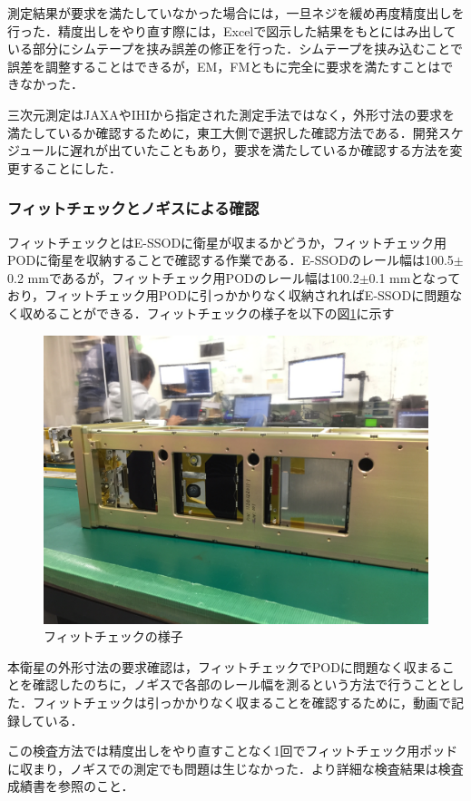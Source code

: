 測定結果が要求を満たしていなかった場合には，一旦ネジを緩め再度精度出しを行った．精度出しをやり直す際には，Excelで図示した結果をもとにはみ出している部分にシムテープを挟み誤差の修正を行った．シムテープを挟み込むことで誤差を調整することはできるが，EM，FMともに完全に要求を満たすことはできなかった．

三次元測定はJAXAやIHIから指定された測定手法ではなく，外形寸法の要求を満たしているか確認するために，東工大側で選択した確認方法である．開発スケジュールに遅れが出ていたこともあり，要求を満たしているか確認する方法を変更することにした．

\subsubsection{フィットチェックとノギスによる確認}

フィットチェックとはE-SSODに衛星が収まるかどうか，フィットチェック用PODに衛星を収納することで確認する作業である．E-SSODのレール幅は100.5$\pm$0.2 mmであるが，フィットチェック用PODのレール幅は100.2$\pm$0.1 mmとなっており，フィットチェック用PODに引っかかりなく収納されればE-SSODに問題なく収めることができる．フィットチェックの様子を以下の図\ref{fig:fitcheck}に示す

\begin{figure}[h]
	\begin{center}
		
		\includegraphics[width=0.6\linewidth]{04/fig/fitcheck.JPG}
		\caption{フィットチェックの様子}
		\label{fig:fitcheck}
		
	\end{center}
\end{figure}

本衛星の外形寸法の要求確認は，フィットチェックでPODに問題なく収まることを確認したのちに，ノギスで各部のレール幅を測るという方法で行うこととした．フィットチェックは引っかかりなく収まることを確認するために，動画で記録している．

この検査方法では精度出しをやり直すことなく1回でフィットチェック用ポッドに収まり，ノギスでの測定でも問題は生じなかった．より詳細な検査結果は検査成績書を参照のこと．

